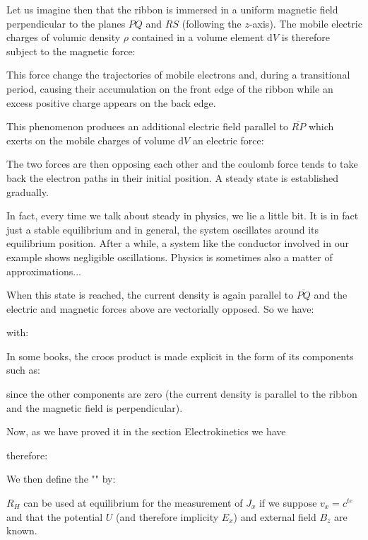 	Let us imagine then that the ribbon is immersed in a uniform magnetic field perpendicular to the planes $PQ$ and $RS$ (following the $z$-axis). The mobile electric charges of volumic density $\rho$ contained in a volume element $\mathrm{d}V$ is therefore subject to the magnetic force:
	
	This force change the trajectories of mobile electrons and, during a transitional period, causing their accumulation on the front edge of the ribbon while an excess positive charge appears on the back edge.

	This phenomenon produces an additional electric field parallel to $\overline{RP}$ which exerts on the mobile charges of volume $\mathrm{d}V$ an electric force:
	
	The two forces are then opposing each other and the coulomb force tends to take back the electron paths in their initial position. A steady state is established gradually.
	\begin{tcolorbox}[title=Remark,colframe=black,arc=10pt]
	In fact, every time we talk about steady in physics, we lie a little bit. It is in fact just a stable equilibrium and in general, the system oscillates around its equilibrium position. After a while, a system like the conductor involved in our example shows negligible oscillations. Physics is sometimes also a matter of approximations...
	\end{tcolorbox}
	When this state is reached, the current density is again parallel to $\overline{PQ}$ and the electric and magnetic forces above are vectorially opposed. So we have:
	
	with:
	
	In some books, the croos product is made explicit in the form of its components such as:
	
	since the other components are zero (the current density is parallel to the ribbon and the magnetic field is perpendicular).

	Now, as we have proved it in the section Electrokinetics we have
	
	therefore:
	
	We then define the "" by:
	
	$R_H$ can be used at equilibrium for the measurement of $J_x$ if we suppose $v_x=c^{te}$ and that the potential $U$ (and therefore implicity $E_x$) and external field $B_z$ are known.  

